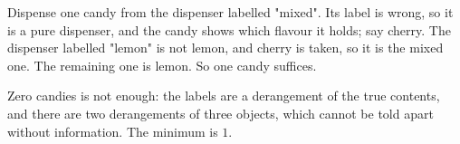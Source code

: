 Dispense one candy from the dispenser labelled "mixed". Its label is wrong, so it is a pure dispenser, and the candy shows which flavour it holds; say cherry. The dispenser labelled "lemon" is not lemon, and cherry is taken, so it is the mixed one. The remaining one is lemon. So one candy suffices.

Zero candies is not enough: the labels are a derangement of the true contents, and there are two derangements of three objects, which cannot be told apart without information. The minimum is $\boxed{1}$.
